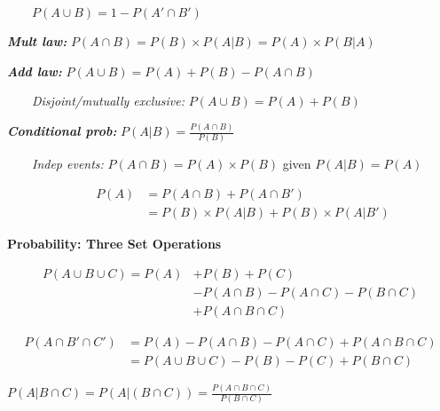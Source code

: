 \documentclass[twocolumn]{article}
\begin{document}
$\quad\quad P(A \cup B) = 1 - P(A' \cap B')$

\textbf{\textit{Mult law:}} $P(A \cap B) = P(B) \times P(A | B) = P(A) \times P(B|A)$

\textbf{\textit{Add law:}} $P(A \cup B) = P(A) + P(B) - P(A \cap B)$

$\quad\quad$\textit{Disjoint/mutually exclusive:} $P(A \cup B) = P(A) + P(B)$

\textbf{\textit{Conditional prob:}} $P(A | B) = \frac{P(A \cap B)}{P(B)}$

$\quad\quad$\textit{Indep events:} $P(A \cap B) = P(A) \times P(B)$ \hfill given $P(A|B) = P(A)$

\vspace{-1em}
\begin{fleqn}
    \begin{align*}
        \quad\quad P(A) &= P(A \cap B) + P(A \cap B') \\
        &= P(B) \times P(A|B) + P(B) \times P(A | B')
    \end{align*}
\end{fleqn} \vspace{-2em}

\vspace{-.5em}
\dotfill

\textbf{Probability: Three Set Operations}

\vspace{-1em}
\begin{fleqn}
    \begin{align*}
        P(A \cup B \cup C) = P(A) &+ P(B) + P(C) \\
        &- P(A \cap B) - P(A \cap C) - P(B \cap C) \\
        &+ P(A \cap B \cap C)
    \end{align*}

    \vspace{-2em}

    \begin{align*}
        P(A \cap B' \cap C') &= P(A) - P(A \cap B) - P(A \cap C) + P(A \cap B \cap C) \\
        &= P(A \cup B \cup C) - P(B) - P(C) + P(B \cap C)
    \end{align*}
\end{fleqn} \vspace{-2em}

$P(A | B \cap C) = P(A | (B \cap C)) = \frac{P(A \cap B \cap C)}{P(B \cap C)}$

\dotfill
\end{document}
